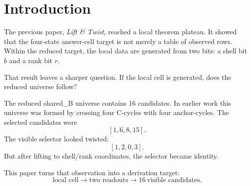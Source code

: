 \section{Introduction}

The previous paper, \emph{Lift \& Twist}, reached a local theorem plateau.  It showed that the four-state answer-cell target is not merely a table of observed rows.  Within the reduced target, the local data are generated from two bits: a shell bit \(b\) and a rank bit \(r\).

That result leaves a sharper question.  If the local cell is generated, does the reduced universe follow?

The reduced shared\_B universe contains 16 candidates.  In earlier work this universe was formed by crossing four C-cycles with four anchor-cycles.  The selected candidates were
\[
    [1,6,8,15].
\]
The visible selector looked twisted:
\[
    [1,2,0,3].
\]
But after lifting to shell/rank coordinates, the selector became identity.

This paper turns that observation into a derivation target:
\[
    \text{local cell} \longrightarrow \text{two readouts} \longrightarrow 16\ \text{visible candidates}.
\]
